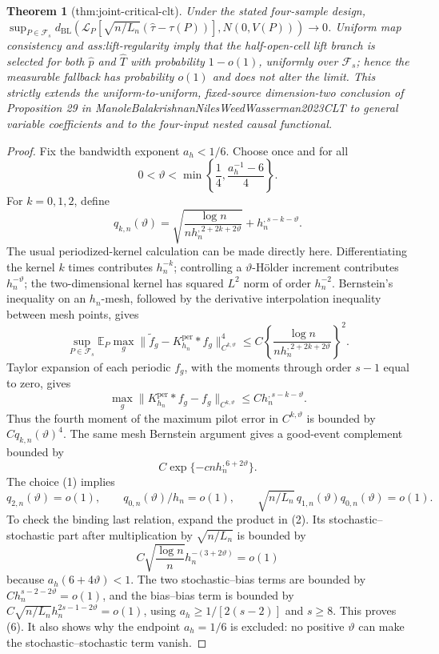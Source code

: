 \documentclass{article}
\newtheorem{theorem}{Theorem}
\begin{document}
\begin{theorem}[thm:joint-critical-clt]\label{thm:joint-critical-clt}
Under the stated four-sample design, \(\sup_{P\in\mathcal F_s}d_{\mathrm{BL}}(\mathcal L_P[\sqrt{n/L_n}(\widehat\tau-\tau(P))],N(0,V(P)))\to0\). Uniform map consistency and ass:lift-regularity imply that the half-open-cell lift branch is selected for both \(\widehat p\) and \(\widehat T\) with probability \(1-o(1)\), uniformly over \(\mathcal F_s\); hence the measurable fallback has probability \(o(1)\) and does not alter the limit. This strictly extends the uniform-to-uniform, fixed-source dimension-two conclusion of Proposition 29 in ManoleBalakrishnanNilesWeedWasserman2023CLT to general variable coefficients and to the four-input nested causal functional.
\end{theorem}
\begin{proof}
Fix the bandwidth exponent \(a_h<1/6\).  Choose once and for all
\[
 0<\vartheta<\min\left\{\frac14,\frac{a_h^{-1}-6}{4}\right\}.        \tag{1}
\]
For \(k=0,1,2\), define
\[
 q_{k,n}(\vartheta)=
 \sqrt{\frac{\log n}{n h_n^{,2+2k+2\vartheta}}}
 +h_n^{,s-k-\vartheta}.                                               \tag{2}
\]
The usual periodized-kernel calculation can be made directly here.  Differentiating the kernel \(k\) times contributes \(h_n^{-k}\); controlling a \(\vartheta\)-H\"older increment contributes \(h_n^{-\vartheta}\); the two-dimensional kernel has squared \(L^2\) norm of order \(h_n^{-2}\).  Bernstein's inequality on an \(h_n\)-mesh, followed by the derivative interpolation inequality between mesh points, gives
\[
 \sup_{P\in\mathcal F_s}
 \mathbb E_P\max_g
 \|\widetilde f_g-K_{h_n}^{\mathrm{per}}*f_g\|_{C^{k,\vartheta}}^4
 \leq C\left\{\frac{\log n}
 {n h_n^{,2+2k+2\vartheta}}\right\}^2.                               \tag{3}
\]
Taylor expansion of each periodic \(f_g\), with the moments through order \(s-1\) equal to zero, gives
\[
 \max_g\|K_{h_n}^{\mathrm{per}}*f_g-f_g\|_{C^{k,\vartheta}}
 \leq Ch_n^{,s-k-\vartheta}.                                        \tag{4}
\]
Thus the fourth moment of the maximum pilot error in \(C^{k,\vartheta}\) is bounded by \(Cq_{k,n}(\vartheta)^4\).  The same mesh Bernstein argument gives a good-event complement bounded by
\[
 C\exp\{-cnh_n^{,6+2\vartheta}\}.                                   \tag{5}
\]
The choice (1) implies
\[
 q_{2,n}(\vartheta)=o(1),\qquad
 q_{0,n}(\vartheta)/h_n=o(1),\qquad
 \sqrt{n/L_n}\,q_{1,n}(\vartheta)q_{0,n}(\vartheta)=o(1).             \tag{6}
\]
To check the binding last relation, expand the product in (2).  Its stochastic--stochastic part after multiplication by \(\sqrt{n/L_n}\) is bounded by
\[
 C\sqrt{\frac{\log n}{n}}h_n^{-(3+2\vartheta)}=o(1)
\]
because \(a_h(6+4\vartheta)<1\).  The two stochastic--bias terms are bounded by \(Ch_n^{s-2-2\vartheta}=o(1)\), and the bias--bias term is bounded by
\(C\sqrt{n/L_n}h_n^{2s-1-2\vartheta}=o(1)\), using
\(a_h\geq1/[2(s-2)]\) and \(s\geq8\).  This proves (6).  It also shows why the endpoint \(a_h=1/6\) is excluded: no positive \(\vartheta\) can make the stochastic--stochastic term vanish.


\end{proof}
\end{document}
